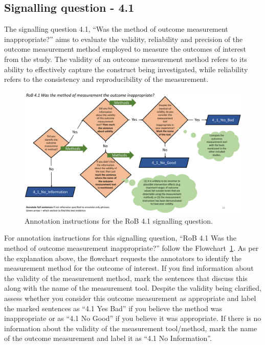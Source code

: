 \documentclass[sn-mathphys,Numbered]{sn-jnl}%
\begin{document}
\subsection*{Signalling question - 4.1 }
%
The signalling question 4.1, ``Was the method of outcome measurement inappropriate?'' aims to evaluate the validity, reliability and precision of the outcome measurement method employed to measure the outcomes of interest from the study.
The validity of an outcome measurement method refers to its ability to effectively capture the construct being investigated, while reliability refers to the consistency and reproducibility of the measurement.

%
%
%
\begin{figure}[hbt]
    \centering
    \includegraphics[width=\textwidth]{figures/4_1.pdf}
    \caption{Annotation instructions for the RoB 4.1 signalling question.}
    \label{fig:4_1}
\end{figure}
%
%
%


For annotation instructions for this signalling question, ``RoB 4.1 Was the method of outcome measurement inappropriate?'' follow the Flowchart~\ref{fig:4_1}.
As per the explanation above, the flowchart requests the annotators to identify the measurement method for the outcome of interest.
If you find information about the validity of the measurement method, mark the sentences that discuss this along with the name of the measurement tool.
Despite the validity being clarified, assess whether you consider this outcome measurement as appropriate and label the marked sentences as ``4.1 Yes Bad'' if you believe the method was inappropriate or as ``4.1 No Good'' if you believe it was appropriate.
If there is no information about the validity of the measurement tool/method, mark the name of the outcome measurement and label it as ``4.1 No Information''.
%
%
%
\end{document}

